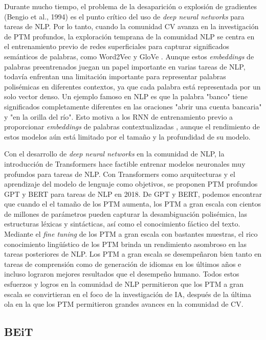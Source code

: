 Durante mucho tiempo, el problema de la desaparición o explosión de gradientes (Bengio et al., 1994) es el punto crítico del uso de \textit{deep neural networks} para tareas de NLP. Por lo tanto, cuando la comunidad CV avanza en la investigación de PTM profundos, la exploración temprana de la comunidad NLP se centra en el entrenamiento previo de redes superficiales para capturar significados semánticos de palabras, como Word2Vec \parencite{87} y GloVe \parencite{88}. Aunque estos \textit{embeddings} de palabras preentrenados juegan un papel importante en varias tareas de NLP, todavía enfrentan una limitación importante para representar palabras polisémicas en diferentes contextos, ya que cada palabra está representada por un solo vector denso. Un ejemplo famoso en NLP es que la palabra "banco" tiene significados completamente diferentes en las oraciones "abrir una cuenta bancaria" y "en la orilla del río". Esto motiva a los RNN de entrenamiento previo a proporcionar \textit{embeddings} de palabras contextualizadas \parencite{89} \parencite{90}, aunque el rendimiento de estos modelos aún está limitado por el tamaño y la profundidad de su modelo.  

Con el desarrollo de \textit{deep neural networks} en la comunidad de NLP, la introducción de Transformers \parencite{25} hace factible entrenar modelos neuronales muy profundos para tareas de NLP. Con Transformers como arquitecturas y el aprendizaje del modelo de lenguaje como objetivos, se proponen PTM profundos GPT \parencite{12} y BERT \parencite{11} para tareas de NLP en 2018. De GPT y BERT, podemos encontrar que cuando el el tamaño de los PTM aumenta, los PTM a gran escala con cientos de millones de parámetros pueden capturar la desambiguación polisémica, las estructuras léxicas y sintácticas, así como el conocimiento fáctico del texto. Mediante el \textit{fine tuning} de los PTM a gran escala con bastantes muestras, el rico conocimiento lingüístico de los PTM brinda un rendimiento asombroso en las tareas posteriores de NLP. Los PTM a gran escala se desempeñaron bien tanto en tareas de comprensión como de generación de idiomas en los últimos años e incluso lograron mejores resultados que el desempeño humano. Todos estos esfuerzos y logros en la comunidad de NLP permitieron que los PTM a gran escala se convirtieran en el foco de la investigación de IA, después de la última ola en la que los PTM permitieron grandes avances en la comunidad de CV.

\subsection{BEiT}

